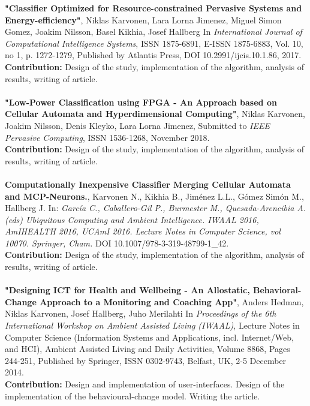 \documentclass{article}
\begin{document}
\textbf{ "Classifier Optimized for Resource-constrained Pervasive Systems and Energy-efficiency"}, 
Niklas Karvonen, Lara Lorna Jimenez, Miguel Simon Gomez, Joakim Nilsson, Basel Kikhia, Josef Hallberg
In \textit{International Journal of Computational Intelligence Systems}, ISSN 1875-6891, E-ISSN 1875-6883, Vol. 10, no 1, p. 1272-1279, 
Published by Atlantis Press, 
DOI 10.2991/ijcis.10.1.86, 
2017.\\
\textbf{Contribution:} Design of the study, implementation of the algorithm, analysis of results, writing of article.
\\ \\

\textbf{ "Low-Power Classification using FPGA - An Approach based on Cellular Automata and Hyperdimensional Computing"}, 
Niklas Karvonen, Joakim Nilsson, Denis Kleyko, Lara Lorna Jimenez,
Submitted to \textit{ IEEE Pervasive Computing}, ISSN 1536-1268, 
November 2018.\\
\textbf{Contribution:} Design of the study, implementation of the algorithm, analysis of results, writing of article.
\\ \\

\textbf{Computationally Inexpensive Classifier Merging Cellular Automata and MCP-Neurons.},
Karvonen N., Kikhia B., Jiménez L.L., Gómez Simón M., Hallberg J.
In: \textit{García C., Caballero-Gil P., Burmester M., Quesada-Arencibia A. (eds) Ubiquitous Computing and Ambient Intelligence. IWAAL 2016, AmIHEALTH 2016, UCAmI 2016. Lecture Notes in Computer Science, vol 10070. Springer, Cham.}
DOI 10.1007/978-3-319-48799-1\_42.\\
\textbf{Contribution:} Design of the study, implementation of the algorithm, analysis of results, writing of article.
\\ \\

\textbf{ "Designing ICT for Health and Wellbeing - An Allostatic, Behavioral-Change Approach to a Monitoring and Coaching App"}, 
Anders Hedman, Niklas Karvonen, Josef Hallberg, Juho Merilahti
In \textit{Proceedings of the 6th International Workshop on Ambient Assisted Living (IWAAL)}, Lecture Notes in Computer Science (Information Systems and Applications, incl. Internet/Web, and HCI), Ambient Assisted Living and Daily Activities, Volume 8868, Pages 244-251, 
Published by Springer, ISSN 0302-9743, Belfast, UK, 
2-5 December 2014.\\
\textbf{Contribution:} Design and implementation of user-interfaces. Design of the implementation of the behavioural-change model. Writing the article.
\\ \\
\end{document}
